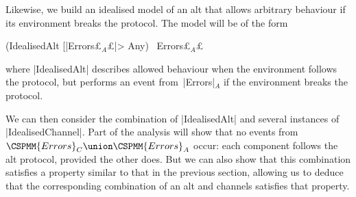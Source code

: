 Likewise, we build an idealised model of an alt that allows arbitrary
behaviour if its environment breaks the protocol.  The model will be of the
form 
%
\begin{cspm}
(IdealisedAlt [|Errors£$_A$£|> Any) \ Errors£$_A$£
\end{cspm}
%
where |IdealisedAlt| describes allowed behaviour when the environment follows
the protocol, but performs an event from~|Errors|$_A$ if the environment
breaks the protocol.

We can then consider the combination of |IdealisedAlt| and several instances of
|IdealisedChannel|.  Part of the analysis will show that no events from
$\CSPMM{Errors}_C \union \CSPMM{Errors}_A$ occur: each component follows the
alt protocol, provided the other does.  But we can also show that this
combination satisfies a property similar to that in the previous section,
allowing us to deduce that the corresponding combination of an alt and
channels satisfies that property. 


